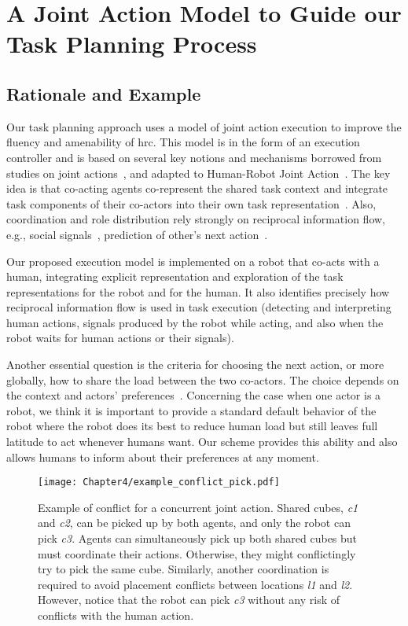 \section{A Joint Action Model to Guide our Task Planning Process}

    \subsection{Rationale and Example}

Our task planning approach uses a model of joint action execution to improve the fluency and amenability of \acrshort{hrc}. 
This model is in the form of an execution controller and is based on several key notions and mechanisms borrowed from studies on joint actions~\cite{Sebanz_2016,kourtis2014attention}, and adapted to Human-Robot Joint Action~\cite{clodic-2017,curioni-2019}.
The key idea is that co-acting agents co-represent the shared task context and integrate task components of their co-actors into their own task representation~\cite{Schmitz-2017, Yamaguchi-19}. Also, coordination and role distribution rely strongly on reciprocal information flow, e.g., social signals~\cite{curioni-2019}, prediction of other's next action~\cite{luke-2018}.

Our proposed execution model is implemented on a robot that co-acts with a human, integrating explicit representation and exploration of the task representations for the robot and for the human. 
It also identifies precisely how reciprocal information flow is used in task execution (detecting and interpreting human actions, signals produced by the robot while acting, and also when the robot waits for human actions or their signals).

Another essential question is the criteria for choosing the next action, or more globally, how to share the load between the two co-actors. The choice depends on the context and actors' preferences~\cite{Gombolay-2015, Strachan-2020, Curioni-2022}. 
Concerning the case when one actor is a robot, we think it is important to provide a standard default behavior of the robot where the robot does its best to reduce human load but still leaves full latitude to act whenever humans want. 
Our scheme provides this ability and also allows humans to inform about their preferences at any moment.

\begin{figure}[h]
    \center
    \texttt{[image: Chapter4/example\_conflict\_pick.pdf]}
    \caption{Example of conflict for a concurrent joint action. 
    Shared cubes, \emph{c1} and \emph{c2}, can be picked up by both agents, and only the robot can pick \emph{c3}. 
    Agents can simultaneously pick up both shared cubes but must coordinate their actions. Otherwise, they might conflictingly try to pick the same cube. 
    Similarly, another coordination is required to avoid placement conflicts between locations \emph{l1} and \emph{l2}.
    However, notice that the robot can pick \emph{c3} without any risk of conflicts with the human action.}
    \label{fig:conflict_pick}
\end{figure}


